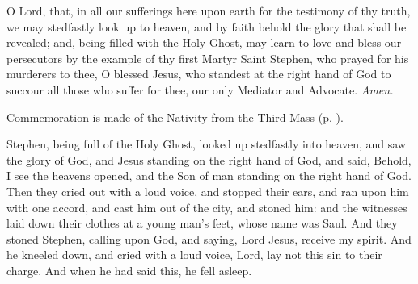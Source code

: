 \collect
{} O Lord, that, in all our sufferings here upon earth for the testimony of thy truth, we may stedfastly look up to heaven, and by faith behold the glory that shall be revealed; and, being filled with the Holy Ghost, may learn to love and bless our persecutors by the example of thy first Martyr Saint Stephen, who prayed for his murderers to thee, O blessed Jesus, who standest at the right hand of God to succour all those who suffer for thee, our only Mediator and Advocate. \textit{Amen.}
\begin{rubric}
    Commemoration is made of the Nativity from the Third Mass (p. \pageref{NativityMassIIICollect}).
\end{rubric}

 Stephen, being full of the Holy Ghost, looked up stedfastly into heaven, and saw the glory of God, and Jesus standing on the right hand of God, and said, Behold, I see the heavens opened, and the Son of man standing on the right hand of God. Then they cried out with a loud voice, and stopped their ears, and ran upon him with one accord, and cast him out of the city, and stoned him: and the witnesses laid down their clothes at a young man’s feet, whose name was Saul. And they stoned Stephen, calling upon God, and saying, Lord Jesus, receive my spirit. And he kneeled down, and cried with a loud voice, Lord, lay not this sin to their charge. And when he had said this, he fell asleep.


